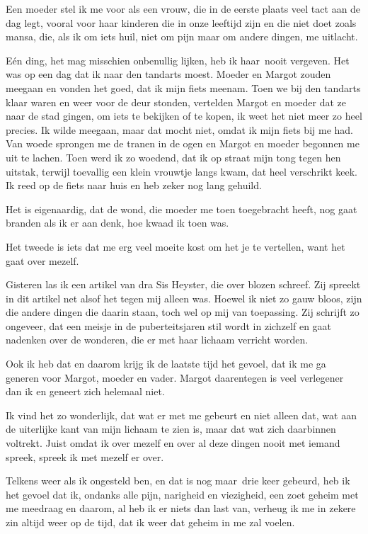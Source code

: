 \documentclass{book}
\begin{document}
Een moeder stel ik me voor als een vrouw, die in de eerste plaats veel tact aan
de dag legt, vooral voor haar kinderen die in onze leeftijd zijn en die niet
doet zoals mansa, die, als ik om iets huil, niet om pijn maar om andere dingen,
me uitlacht.

Eén ding, het mag misschien onbenullig lijken, heb ik haar~nooit vergeven. Het
was op een dag dat ik naar den tandarts moest. Moeder en Margot zouden meegaan
en vonden het goed, dat ik mijn fiets meenam. Toen we bij den tandarts klaar
waren en weer voor de deur stonden, vertelden Margot en moeder dat ze naar de
stad gingen, om iets te bekijken of te kopen, ik weet het niet meer zo heel
precies. Ik wilde meegaan, maar dat mocht niet, omdat ik mijn fiets bij me had.
Van woede sprongen me de tranen in de ogen en Margot en moeder begonnen me uit
te lachen. Toen werd ik zo woedend, dat ik op straat mijn tong tegen hen
uitstak, terwijl toevallig een klein vrouwtje langs kwam, dat heel verschrikt
keek. Ik reed op de fiets naar huis en heb zeker nog lang gehuild.

Het is eigenaardig, dat de wond, die moeder me toen toegebracht heeft, nog gaat
branden als ik er aan denk, hoe kwaad ik toen was.

Het tweede is iets dat me erg veel moeite kost om het je te vertellen, want het
gaat over mezelf.

Gisteren las ik een artikel van dra Sis Heyster, die over blozen schreef. Zij
spreekt in dit artikel net alsof het tegen mij alleen was.  Hoewel ik niet zo
gauw bloos, zijn die andere dingen die daarin staan, toch wel op mij van
toepassing. Zij schrijft zo ongeveer, dat een meisje in de puberteitsjaren stil
wordt in zichzelf en gaat nadenken over de wonderen, die er met haar lichaam
verricht worden.

Ook ik heb dat en daarom krijg ik de laatste tijd het gevoel, dat ik me ga
generen voor Margot, moeder en vader. Margot daarentegen is veel verlegener dan
ik en geneert zich helemaal niet.

Ik vind het zo wonderlijk, dat wat er met me gebeurt en niet alleen dat, wat aan
de uiterlijke kant van mijn lichaam te zien is, maar dat wat zich daarbinnen
voltrekt. Juist omdat ik over mezelf en over al deze dingen nooit met iemand
spreek, spreek ik met mezelf er over.

Telkens weer als ik ongesteld ben, en dat is nog maar~drie keer gebeurd, heb ik
het gevoel dat ik, ondanks alle pijn, narigheid en viezigheid, een zoet geheim
met me meedraag en daarom, al heb ik er niets dan last van, verheug ik me in
zekere zin altijd weer op de tijd, dat ik weer dat geheim in me zal voelen.
\end{document}

